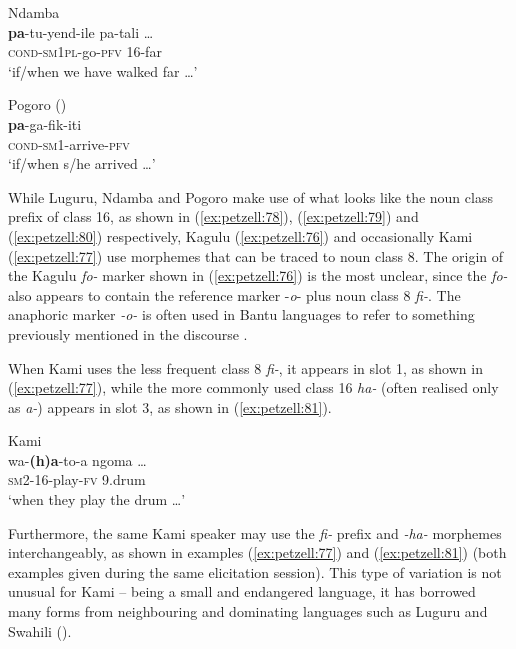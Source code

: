 \documentclass[output=paper,
            colorlinks, citecolor=brown
            ,draftmode
		  ]{langscibook}
\begin{document}
\ex\label{ex:petzell:79}Ndamba\\
\gll \textbf{pa}{}-tu-yend-ile          pa-tali \ldots \\
\textsc{cond}{}-\textsc{sm1pl}{}-go-\textsc{pfv} {16-far}\\
\glt `if/when we have walked far \ldots'


\ex\label{ex:petzell:80}Pogoro (\citealt[52]{Hendle1907})\\
\gll \textbf{pa}{}-ga-fik-iti  \\
\textsc{cond}{}-\textsc{sm}1-arrive-\textsc{pfv}\\
\glt `if/when s/he arrived \ldots'
\z


While Luguru, Ndamba and Pogoro make use of what looks like the noun class prefix of class 16, as shown in  (\ref{ex:petzell:78}), (\ref{ex:petzell:79}) and (\ref{ex:petzell:80}) respectively, Kagulu (\ref{ex:petzell:76}) and occasionally Kami (\ref{ex:petzell:77}) use morphemes that can be traced to noun class 8. The origin of the Kagulu \textit{fo-} marker shown in  (\ref{ex:petzell:76}) is the most unclear, since the \textit{fo-} also appears to contain the reference marker \nobreakdash-\textit{o}{}- plus noun class 8 \textit{fi-}. The anaphoric marker \textit{{}-o-} is often used in Bantu languages to refer to something previously mentioned in the discourse \citep[275]{Güldemann2002}.



When Kami uses the less frequent class 8 \textit{fi-}, it appears in slot 1, as shown in  (\ref{ex:petzell:77}), while the more commonly used class 16 \textit{ha-} (often realised only as \textit{a-}) appears in slot 3, as shown in  (\ref{ex:petzell:81}).


\ea\label{ex:petzell:81}Kami\\
\gll wa{{}-}\textbf{(}\textbf{h)a}{}-to-a       ngoma \ldots\\
\textsc{sm}2-{16}{}-play-\textsc{fv}    9.drum\\
\glt `when they play the drum \ldots'
\z


Furthermore, the same Kami speaker may use the \textit{fi-} prefix and \textit{{}-ha-} morphemes interchangeably, as shown in examples (\ref{ex:petzell:77}) and (\ref{ex:petzell:81}) (both examples given during the same elicitation session). This type of variation is not unusual for Kami -- being a small and endangered language, it has borrowed many forms from neighbouring and dominating languages such as Luguru and Swahili (\citealt{PetzellAunio2019}).
\end{document}
